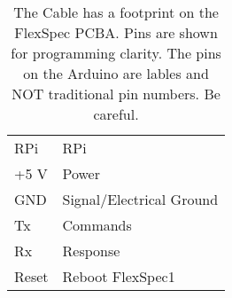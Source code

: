 \begin{table}[h!]
\centering
\begin{tabular}{| l | l |}
\hline
RPi      &  RPi                         \\
+5 V     &  Power                       \\ 
GND      &  Signal/Electrical Ground    \\ 
Tx       &  Commands                    \\ 
Rx       &  Response                    \\ 
Reset    &  Reboot FlexSpec1            \\ 
\hline
\end{tabular}
\caption[RPi/Ardiuno Cable]{The Cable has a footprint on the FlexSpec
PCBA. Pins are shown for programming clarity. The pins on the Arduino
are lables and NOT traditional pin numbers. Be careful.}
\label{table:RPi/ArdiunoCable}
\end{table}


